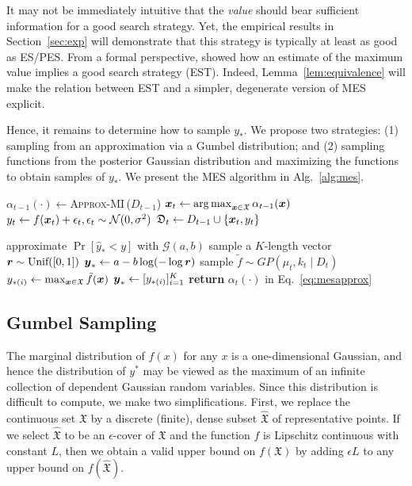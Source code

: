 It may not be immediately intuitive that the \emph{value} should bear sufficient information for a good search strategy. Yet, the empirical results in Section~\ref{sec:exp} will demonstrate that this strategy is typically at least as good as ES/PES. From a formal perspective,  \citet{wang2016est} showed how an estimate of the maximum value implies a good search strategy (EST). Indeed, Lemma~\ref{lem:equivalence} will make the relation between EST and a simpler, degenerate version of MES explicit.

Hence, it remains to determine how to sample $y_*$. We propose two strategies: (1) sampling from an approximation via a Gumbel distribution; and (2) sampling functions from the posterior Gaussian distribution and maximizing the functions to obtain samples of $y_*$. We present the MES algorithm in Alg.~\ref{alg:mes}.%

\begin{algorithm} %
  \caption{Max-value Entropy Search (MES)%
  }\label{alg:mes}
  \begin{algorithmic}[1]
      \STATE $\alpha_{t-1}(\cdot)\gets$\textsc{Approx-MI\,}($D_{t-1}$)%
      \STATE ${\boldsymbol{x}}_t\gets \operatorname{arg\,max}_{{\boldsymbol{x}}\in\mathfrak X}{\alpha_{t-1}({\boldsymbol{x}})}$ 
      \STATE $y_t\gets f({\boldsymbol{x}}_t) + \epsilon_t, \epsilon_t\sim\mathcal N(0,\sigma^2)$
      \STATE $\mathfrak D_t \gets D_{t-1}\cup \{{\boldsymbol{x}}_t,y_t\}$
      \ENDFOR
      \ENDFUNCTION
      \item[]
    \STATE approximate $\Pr[\hat{y}_* < y]$ with $\mathcal G(a,b)$
    \STATE sample a $K$-length vector $\boldsymbol{r}\sim \text{Unif}([0,1])$
    \STATE $\boldsymbol{y}_* \gets a-b\log(-\log \boldsymbol{r})$
    \ELSE
    \STATE sample $\tilde f \sim GP(\mu_t,k_t \mid D_t)$
    \STATE $y_{*(i)} \gets \max_{{\boldsymbol{x}}\in\mathfrak X}{\tilde f({\boldsymbol{x}})}$
    \ENDFOR 
    \STATE $\boldsymbol{y}_* \gets [y_{*(i)}]_{i=1}^K$
    \ENDIF
    \STATE \textbf{return} $\alpha_t(\cdot)$ in Eq.~\eqref{eq:mesapprox}
    \ENDFUNCTION
  \end{algorithmic}
\end{algorithm}

\subsection{Gumbel Sampling} %
\label{spec:gumbel}
The marginal distribution of $f(x)$ for any $x$ is a one-dimensional Gaussian, and hence the distribution of $y^*$ may be viewed as the maximum of an infinite collection of dependent Gaussian random variables.
%
Since this distribution is difficult to compute, we make two simplifications. First, we replace the continuous set $\mathfrak X$ by a discrete (finite), dense subset $\hat{\mathfrak X}$ of representative points. If we select $\hat{\mathfrak X}$ to be an $\epsilon$-cover of $\mathfrak X$ and the function $f$ is Lipschitz continuous with constant $L$, then we obtain a valid upper bound on $f(\mathfrak X)$ by adding $\epsilon L$ to any upper bound on $f(\hat{\mathfrak X})$.

